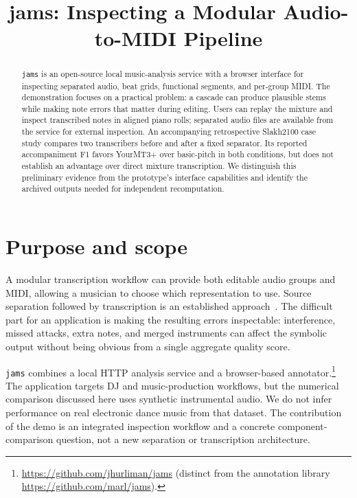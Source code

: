 \documentclass{article}
\title{jams: Inspecting a Modular Audio-to-MIDI Pipeline}
\newcommand{\jams}{\texttt{jams}}
\begin{document}
\maketitle

\begin{abstract}
\jams{} is an open-source local music-analysis service with a browser interface for
inspecting separated audio, beat grids, functional segments, and per-group MIDI.
The demonstration focuses on a practical problem: a cascade can produce plausible
stems while making note errors that matter during editing. Users can replay the
mixture and inspect transcribed notes in aligned piano rolls; separated audio
files are available from the service for external inspection.
An accompanying retrospective Slakh2100 case study compares two transcribers before
and after a fixed separator. Its reported accompaniment F1 favors YourMT3+ over
basic-pitch in both conditions, but does not establish an advantage over direct
mixture transcription. We distinguish this preliminary evidence from the
prototype's interface capabilities and identify the archived outputs needed for
independent recomputation.
\end{abstract}

\section{Purpose and scope}
A modular transcription workflow can provide both editable audio groups and MIDI,
allowing a musician to choose which representation to use. Source separation followed
by transcription is an established approach~\cite{derby2024pipeline}. The difficult
part for an application is making the resulting errors inspectable: interference,
missed attacks, extra notes, and merged instruments can affect the symbolic output
without being obvious from a single aggregate quality score.

\jams{} combines a local HTTP analysis service and a browser-based annotator.\footnote{\raggedright
\url{https://github.com/jhurliman/jams} (distinct from the annotation library
\url{https://github.com/marl/jams}).}
The application targets DJ and music-production workflows, but the numerical
comparison discussed here uses synthetic instrumental audio. We do not infer
performance on real electronic dance music from that dataset. The contribution of
the demo is an integrated inspection workflow and a concrete component-comparison
question, not a new separation or transcription architecture.
\end{document}
